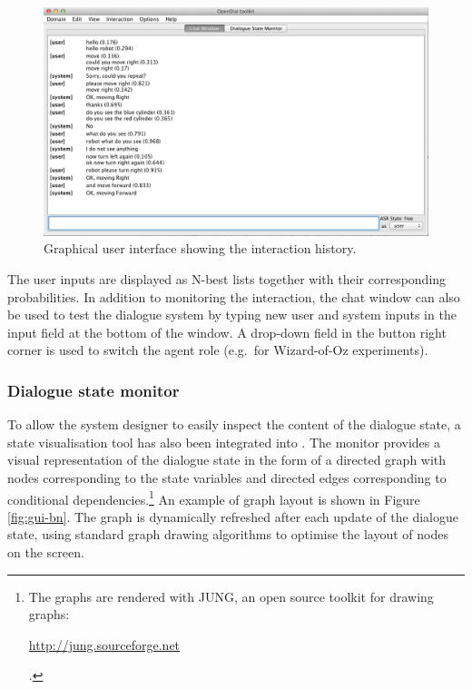 \begin{figure}[ht]
\centering
\includegraphics[scale=0.40]{imgs/gui-chatbox.png}
\caption{Graphical user interface showing the interaction history.}
\label{fig:gui-chatbox}
\end{figure}

  The user inputs are displayed as N-best lists together with their corresponding probabilities. In addition to monitoring the interaction, the chat window can also be used to test the dialogue system by typing new user and system inputs in the input field at the bottom of the window.  A drop-down field in the button right corner is used to switch the agent role (e.g.\ for Wizard-of-Oz experiments). 


\subsubsection*{Dialogue state monitor}

To allow the system designer to easily inspect the content of the dialogue state, a state visualisation tool has also been integrated into \opendial{}.  The monitor provides a visual representation of the dialogue state in the form of a directed graph with nodes corresponding to the state variables and directed edges corresponding to conditional dependencies.\footnote{The graphs are rendered with JUNG, an open source toolkit for drawing graphs: \begin{scriptsize}\url{http://jung.sourceforge.net}\end{scriptsize}.} An example of graph layout is shown in Figure \ref{fig:gui-bn}. The graph is dynamically refreshed after each update of the dialogue state, using standard graph drawing algorithms to optimise the layout of nodes on the screen. 

